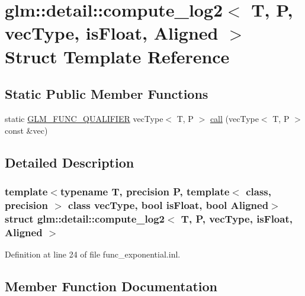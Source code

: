 \hypertarget{structglm_1_1detail_1_1compute__log2}{}\section{glm\+::detail\+::compute\+\_\+log2$<$ T, P, vec\+Type, is\+Float, Aligned $>$ Struct Template Reference}
\label{structglm_1_1detail_1_1compute__log2}
\subsection*{Static Public Member Functions}
\begin{DoxyCompactItemize}
\item 
static \mbox{\hyperlink{setup_8hpp_a33fdea6f91c5f834105f7415e2a64407}{G\+L\+M\+\_\+\+F\+U\+N\+C\+\_\+\+Q\+U\+A\+L\+I\+F\+I\+ER}} vec\+Type$<$ T, P $>$ \mbox{\hyperlink{structglm_1_1detail_1_1compute__log2_a1ed6d8be264cc5602a6808d3574bdb06}{call}} (vec\+Type$<$ T, P $>$ const \&vec)
\end{DoxyCompactItemize}


\subsection{Detailed Description}
\subsubsection*{template$<$typename T, precision P, template$<$ class, precision $>$ class vec\+Type, bool is\+Float, bool Aligned$>$\newline
struct glm\+::detail\+::compute\+\_\+log2$<$ T, P, vec\+Type, is\+Float, Aligned $>$}



Definition at line 24 of file func\+\_\+exponential.\+inl.



\subsection{Member Function Documentation}
\mbox{\label{structglm_1_1detail_1_1compute__log2_a1ed6d8be264cc5602a6808d3574bdb06}} 
